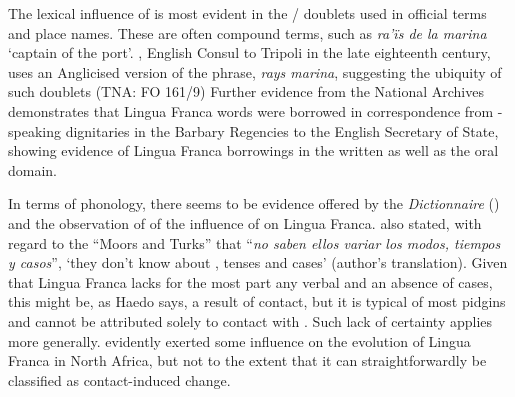 \documentclass[output=paper]{langsci/langscibook}
\begin{document}
	The lexical influence of  is most evident in the / doublets used in official terms and place names. These are often compound terms, such as \textit{ra’ïs de la marina} ‘captain of the port’. , English Consul to Tripoli in the late eighteenth century, uses an Anglicised version of the phrase, \textit{rays marina}, suggesting the ubiquity of such doublets (TNA: FO 161/9) Further evidence from the National Archives \citep{Hopkins1982} demonstrates that Lingua Franca words were borrowed in correspondence from -speaking dignitaries in the Barbary Regencies to the English Secretary of State, showing evidence of Lingua Franca borrowings in the written as well as the oral domain. 
	
	In terms of phonology, there seems to be evidence offered by the \textit{Dictionnaire} (\citeyear{Anonymous1830}) and the observation of \citet{Haedo1612} of the influence of  on Lingua Franca. \citet[24]{Haedo1612} also stated, with regard to the ``Moors and Turks'' that ``\textit{no saben ellos variar los modos, tiempos y casos}'', ‘they don’t know about , tenses and cases’ (author's translation). Given that Lingua Franca lacks for the most part any verbal  and an absence of cases, this might be, as Haedo says, a result of contact, but it is typical of most pidgins and cannot be attributed solely to contact with . Such lack of certainty applies more generally.  evidently exerted some influence on the evolution of Lingua Franca in North Africa, but not to the extent that it can straightforwardly be classified as contact-induced change.
	
\end{document}
